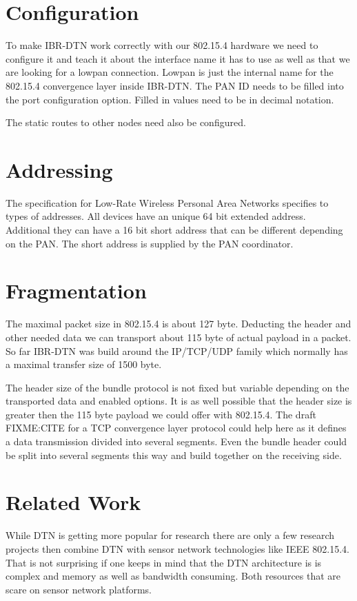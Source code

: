 \section{Configuration}

To make IBR-DTN work correctly with our 802.15.4 hardware we need to configure
it and teach it about the interface name it has to use as well as that we are
looking for a lowpan connection. Lowpan is just the internal name for the
802.15.4 convergence layer inside IBR-DTN. The PAN ID needs to be filled into the
port configuration option. Filled in values need to be in decimal notation.

The static routes to other nodes need also be configured.

\section{Addressing}

The specification for Low-Rate Wireless Personal Area Networks specifies to
types of addresses. All devices have an unique 64 bit extended address.
Additional they can have a 16 bit short address that can be different depending
on the PAN. The short address is supplied by the PAN coordinator.

\section{Fragmentation}

The maximal packet size in 802.15.4 is about 127 byte. Deducting the header
and other needed data we can transport about 115 byte of actual payload in a
packet. So far IBR-DTN was build around the IP/TCP/UDP family which normally has
a maximal transfer size of 1500 byte.

The header size of the bundle protocol is not fixed but variable depending on
the transported data and enabled options. It is as well possible that the header
size is greater then the 115 byte payload we could offer with 802.15.4. The
draft FIXME:CITE for a TCP convergence layer protocol could help here as it
defines a data transmission divided into several segments. Even the bundle
header could be split into several segments this way and build together on the
receiving side.

\section{Related Work}

While DTN is getting more popular for research there are only a few research
projects then combine DTN with sensor network technologies like IEEE 802.15.4.
That is not surprising if one keeps in mind that the DTN architecture is is
complex and memory as well as bandwidth consuming. Both resources that are scare
on sensor network platforms.

